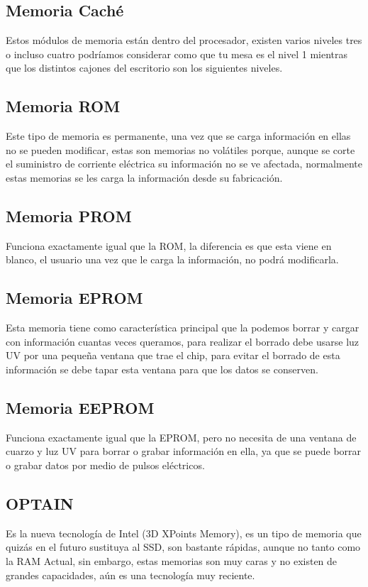 \documentclass{article}
\begin{document}
\subsection{Memoria Caché}

Estos módulos de memoria están dentro del procesador, existen varios niveles tres o incluso cuatro
podríamos considerar como que tu mesa es el nivel 1 mientras que los distintos cajones del escritorio son los siguientes niveles.


\subsection{Memoria ROM}
Este tipo de memoria es permanente, una vez que se carga información en ellas no se pueden modificar, estas son memorias no volátiles porque, aunque se corte el suministro de corriente eléctrica su información no se ve afectada, normalmente estas memorias se les carga la información desde su fabricación.

\subsection{Memoria PROM}
Funciona exactamente igual que la ROM, la diferencia es que esta viene en blanco, el usuario una vez que le carga la información, no podrá modificarla.

\subsection{Memoria EPROM}
Esta memoria tiene como característica principal que la podemos borrar y cargar con información cuantas veces queramos, para realizar el borrado debe usarse luz UV por una pequeña ventana que trae el chip, para evitar el borrado de esta información se debe tapar esta ventana para que los datos se conserven.

\subsection{Memoria EEPROM}
Funciona exactamente igual que la EPROM, pero no necesita de una ventana de cuarzo y luz UV para borrar o grabar información en ella, ya que se puede borrar o grabar datos por medio de pulsos eléctricos.

\subsection{OPTAIN}
Es la nueva tecnología de Intel (3D XPoints Memory), es un tipo de memoria que quizás en el futuro
sustituya al SSD, son bastante rápidas, aunque no tanto como la RAM Actual, sin embargo, estas memorias son muy caras y no existen de grandes capacidades, aún es una tecnología muy reciente.\\
\end{document}
